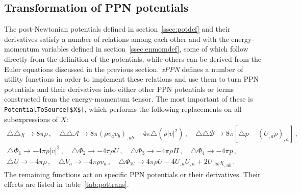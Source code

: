 \documentclass[notitlepage,a4paper,aps,prd,onecolumn,superscriptaddress,nofootinbib,groupedaddress,longbibliography]{revtex4-1}
\newcommand{\xPPN}{\emph{xPPN}}
\begin{document}
\subsection{Transformation of PPN potentials}\label{ssec:pottrans}
The post-Newtonian potentials defined in section~\ref{ssec:potdef} and their derivatives satisfy a number of relations among each other and with the energy-momentum variables defined in section~\ref{ssec:enmomdef}, some of which follow directly from the definition of the potentials, while others can be derived from the Euler equations discussed in the previous section. \xPPN{} defines a number of utility functions in order to implement these relations and use them to turn PPN potentials and their derivatives into either other PPN potentials or terms constructed from the energy-momentum tensor. The most important of these is \lstinline/PotentialToSource[$X$]/, which performs the following replacements on all subexpressions of \(X\):
\begin{gather}
\triangle\triangle\chi \to 8\pi\rho\,, \quad
\triangle\triangle\mathcal{A} \to 8\pi(\rho v_av_b)_{,ab} - 4\pi\triangle(\rho|v|^2)\,, \quad
\triangle\triangle\mathcal{B} \to 8\pi[\triangle p - (U_{,a}\rho)_{,a}]\,,\nonumber\\
\triangle\Phi_1 \to -4\pi\rho|v|^2\,, \quad
\triangle\Phi_2 \to -4\pi\rho U\,, \quad
\triangle\Phi_3 \to -4\pi\rho\Pi\,, \quad
\triangle\Phi_4 \to -4\pi p\,,\\
\triangle U \to -4\pi\rho\,, \quad
\triangle V_a \to -4\pi\rho v_a\,, \quad
\triangle\Phi_W \to 4\pi\rho U - 4U_{,a}U_{,a} + 2U_{,ab}\chi_{,ab}\,.\nonumber
\end{gather}
The remaining functions act on specific PPN potentials or their derivatives. Their effects are listed in table~\ref{tab:pottrans}.
\end{document}

